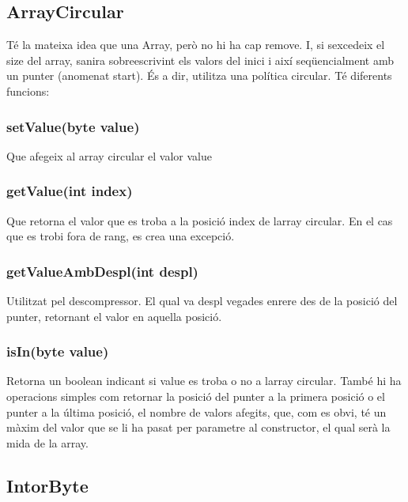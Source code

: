 \subsection*{Array\+Circular}

Té la mateixa idea que una Array, però no hi ha cap remove. I, si s\textquotesingle{}excedeix el size del array, s\textquotesingle{}anira sobreescrivint els valors del inici i així seqüencialment amb un punter (anomenat start). És a dir, utilitza una política circular. Té diferents funcions\+:

\subsubsection*{set\+Value(byte value)}

Que afegeix al array circular el valor value

\subsubsection*{get\+Value(int index)}

Que retorna el valor que es troba a la posició index de l\textquotesingle{}array circular. En el cas que es trobi fora de rang, es crea una excepció.

\subsubsection*{get\+Value\+Amb\+Despl(int despl)}

Utilitzat pel descompressor. El qual va despl vegades enrere des de la posició del punter, retornant el valor en aquella posició.

\subsubsection*{is\+In(byte value)}

Retorna un boolean indicant si value es troba o no a l\textquotesingle{}array circular. També hi ha operacions simples com retornar la posició del punter a la primera posició o el punter a la última posició, el nombre de valors afegits, que, com es obvi, té un màxim del valor que se li ha pasat per parametre al constructor, el qual serà la mida de la array.

\subsection*{Intor\+Byte}

